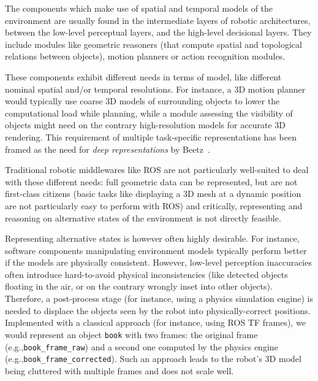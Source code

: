 \documentclass[letterpaper, 10 pt, conference]{ieeeconf}  %
\newcommand{\eg}{e.g.,\xspace}
\begin{document}
The components which make use of spatial and temporal models of the environment
are usually found in the intermediate layers of robotic architectures, between
the low-level perceptual layers, and the high-level decisional layers. They
include modules like geometric reasoners (that compute spatial and topological
relations between objects), motion planners or action recognition modules.

These components exhibit different needs in terms of model,
like different nominal spatial and/or temporal resolutions. For instance, a 3D
motion planner would typically use coarse 3D models of surrounding objects to
lower the computational load while planning, while a module assessing the
visibility of objects might need on the contrary  high-resolution models 
for accurate 3D rendering. This requirement of multiple
task-specific representations has been framed as the need for \emph{deep
representations} by Beetz~\cite{beetz2010towards}.


Traditional robotic middlewares like ROS are not particularly well-suited to
deal with these different needs: full geometric data can be represented, but are
not first-class citizens (basic tasks like displaying a 3D mesh at a dynamic
position are not particularly easy to perform with ROS) and critically,
representing and reasoning on alternative states of the environment is not
directly feasible.

Representing alternative states is however often highly desirable. For instance,
software components manipulating environment models typically perform better if
the models are physically consistent. However, low-level perception inaccuracies
often introduce hard-to-avoid physical inconsistencies (like detected objects
floating in the air, or on the contrary wrongly inset into other objects).
Therefore, a post-process stage (for instance, using a physics simulation
engine) is needed to displace the objects seen by the robot into
physically-correct positions. Implemented with a classical approach (for
instance, using ROS TF frames), we would represent an object {\tt book} with two
frames: the original frame (\eg {\tt book\_frame\_raw}) and a second one
computed by the physics engine (\eg {\tt book\_frame\_corrected}). Such an
approach leads to the robot's 3D model being cluttered with multiple frames and
does not scale well.
\end{document}
